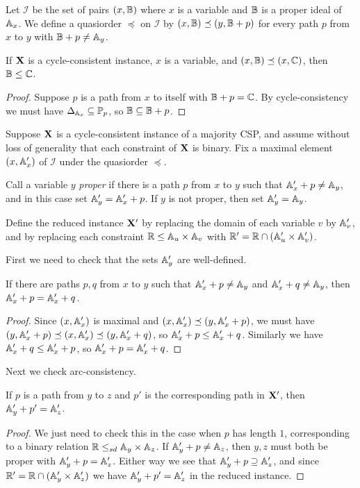 \documentclass[letterpaper,11pt]{article}
\begin{document}
\begin{defn} Let $\mathcal{I}$ be the set of pairs $(x,\mathbb{B})$ where $x$ is a variable and $\mathbb{B}$ is a proper ideal of $\mathbb{A}_x$. We define a quasiorder $\preceq$ on $\mathcal{I}$ by $(x,\mathbb{B}) \preceq (y, \mathbb{B}+p)$ for every path $p$ from $x$ to $y$ with $\mathbb{B} + p \ne \mathbb{A}_y$.
\end{defn}

\begin{prop} If $\mathbf{X}$ is a cycle-consistent instance, $x$ is a variable, and $(x,\mathbb{B}) \preceq (x, \mathbb{C})$, then $\mathbb{B} \le \mathbb{C}$.
\end{prop}
\begin{proof} Suppose $p$ is a path from $x$ to itself with $\mathbb{B} + p = \mathbb{C}$. By cycle-consistency we must have $\Delta_{\mathbb{A}_x} \subseteq \mathbb{P}_p$, so $\mathbb{B} \subseteq \mathbb{B} + p$.
\end{proof}

\begin{defn} Suppose $\mathbf{X}$ is a cycle-consistent instance of a majority CSP, and assume without loss of generality that each constraint of $\mathbf{X}$ is binary. Fix a maximal element $(x,\mathbb{A}_x')$ of $\mathcal{I}$ under the quasiorder $\preceq$.

Call a variable $y$ \emph{proper} if there is a path $p$ from $x$ to $y$ such that $\mathbb{A}_x' + p \ne \mathbb{A}_y$, and in this case set $\mathbb{A}_y' = \mathbb{A}_x' + p$. If $y$ is not proper, then set $\mathbb{A}_y' = \mathbb{A}_y$.

Define the reduced instance $\mathbf{X}'$ by replacing the domain of each variable $v$ by $\mathbb{A}_v'$, and by replacing each constraint $\mathbb{R} \le \mathbb{A}_u \times \mathbb{A}_v$ with $\mathbb{R}' = \mathbb{R} \cap (\mathbb{A}_u' \times \mathbb{A}_v')$.
\end{defn}

First we need to check that the sets $\mathbb{A}_y'$ are well-defined.

\begin{lem} If there are paths $p,q$ from $x$ to $y$ such that $\mathbb{A}_x' + p \ne \mathbb{A}_y$ and $\mathbb{A}_x' + q \ne \mathbb{A}_y$, then $\mathbb{A}_x' + p = \mathbb{A}_x' + q$.
\end{lem}
\begin{proof} Since $(x,\mathbb{A}_x')$ is maximal and $(x,\mathbb{A}_x') \preceq (y, \mathbb{A}_x' + p)$, we must have $(y, \mathbb{A}_x' + p) \preceq (x,\mathbb{A}_x') \preceq (y, \mathbb{A}_x' + q)$, so $\mathbb{A}_x' + p \le \mathbb{A}_x' + q$. Similarly we have $\mathbb{A}_x' + q \le \mathbb{A}_x' + p$, so $\mathbb{A}_x' + p = \mathbb{A}_x' + q$.
\end{proof}

Next we check arc-consistency.

\begin{lem} If $p$ is a path from $y$ to $z$ and $p'$ is the corresponding path in $\mathbf{X}'$, then $\mathbb{A}_y' + p' = \mathbb{A}_z'$.
\end{lem}
\begin{proof} We just need to check this in the case when $p$ has length $1$, corresponding to a binary relation $\mathbb{R} \le_{sd} \mathbb{A}_y \times \mathbb{A}_z$. If $\mathbb{A}_y' + p \ne \mathbb{A}_z$, then $y,z$ must both be proper with $\mathbb{A}_y' + p = \mathbb{A}_z'$. Either way we see that $\mathbb{A}_y' + p \supseteq \mathbb{A}_z'$, and since $\mathbb{R}' = \mathbb{R} \cap (\mathbb{A}_y' \times \mathbb{A}_z')$ we have $\mathbb{A}_y' + p' = \mathbb{A}_z'$ in the reduced instance.
\end{proof}
\end{document}
